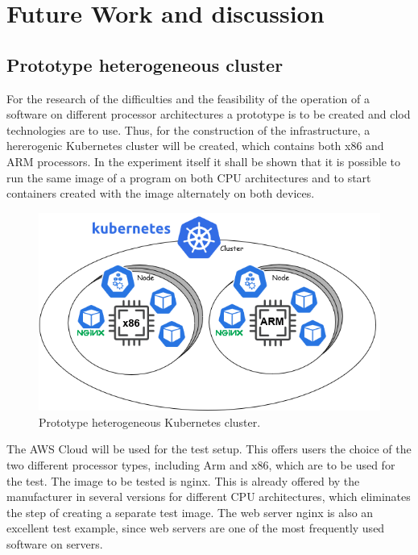 \section{Future Work and discussion}

\subsection{Prototype heterogeneous cluster }
For the research of the difficulties and the feasibility of the operation of a software on different processor architectures a prototype is to be created and clod technologies are to use. Thus, for the construction of the infrastructure, a hererogenic Kubernetes cluster will be created, which contains both x86 and ARM processors. In the experiment itself it shall be shown that it is possible to run the same image of a program on both CPU architectures and to start containers created with the image alternately on both devices. 

\begin{figure}
	\centering
	\includegraphics[width=.95\linewidth]{fig/experiment_k8s_cluster_x86_arm_v1.png}
	\caption{Prototype heterogeneous Kubernetes cluster.}
	\label{fig:prototypeKubeCluster}	
\end{figure}

The AWS Cloud will be used for the test setup. This offers users the choice of the two different processor types, including Arm and x86, which are to be used for the test. The image to be tested is nginx. This is already offered by the manufacturer in several versions for different CPU architectures, which eliminates the step of creating a separate test image. The web server nginx is also an excellent test example, since web servers are one of the most frequently used software on servers.

